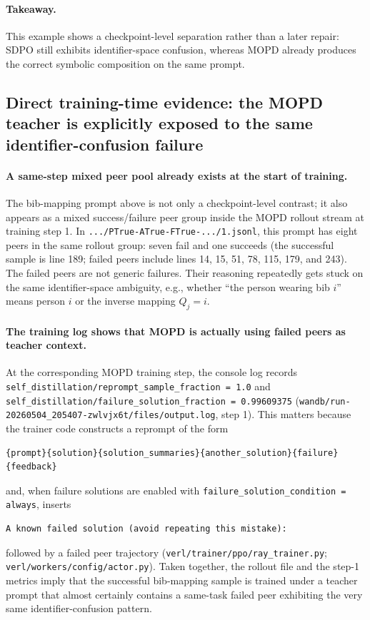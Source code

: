 \paragraph{Takeaway.}
This example shows a checkpoint-level separation rather than a later repair:
SDPO still exhibits identifier-space confusion, whereas MOPD already produces
the correct symbolic composition on the same prompt.

\subsection{Direct training-time evidence: the MOPD teacher is explicitly exposed to the same identifier-confusion failure}

\paragraph{A same-step mixed peer pool already exists at the start of training.}
The bib-mapping prompt above is not only a checkpoint-level contrast; it also
appears as a mixed success/failure peer group inside the MOPD rollout stream at
training step 1.
In
\texttt{.../PTrue-ATrue-FTrue-.../1.jsonl},
this prompt has eight peers in the same rollout group:
seven fail and one succeeds
(the successful sample is line 189; failed peers include lines 14, 15, 51, 78,
115, 179, and 243).
The failed peers are not generic failures.
Their reasoning repeatedly gets stuck on the same identifier-space ambiguity,
e.g., whether ``the person wearing bib $i$'' means person $i$ or the inverse
mapping $Q_j = i$.

\paragraph{The training log shows that MOPD is actually using failed peers as teacher context.}
At the corresponding MOPD training step, the console log records
\texttt{self\_distillation/reprompt\_sample\_fraction = 1.0} and
\texttt{self\_distillation/failure\_solution\_fraction = 0.99609375}
(\texttt{wandb/run-20260504\_205407-zwlvjx6t/files/output.log}, step 1).
This matters because the trainer code constructs a reprompt of the form
\begin{verbatim}
{prompt}{solution}{solution_summaries}{another_solution}{failure}{feedback}
\end{verbatim}
and, when failure solutions are enabled with
\texttt{failure\_solution\_condition = always}, inserts
\begin{verbatim}
A known failed solution (avoid repeating this mistake):
\end{verbatim}
followed by a failed peer trajectory
(\texttt{verl/trainer/ppo/ray\_trainer.py};
\texttt{verl/workers/config/actor.py}).
Taken together, the rollout file and the step-1 metrics imply that the
successful bib-mapping sample is trained under a teacher prompt that almost
certainly contains a same-task failed peer exhibiting the very same
identifier-confusion pattern.


